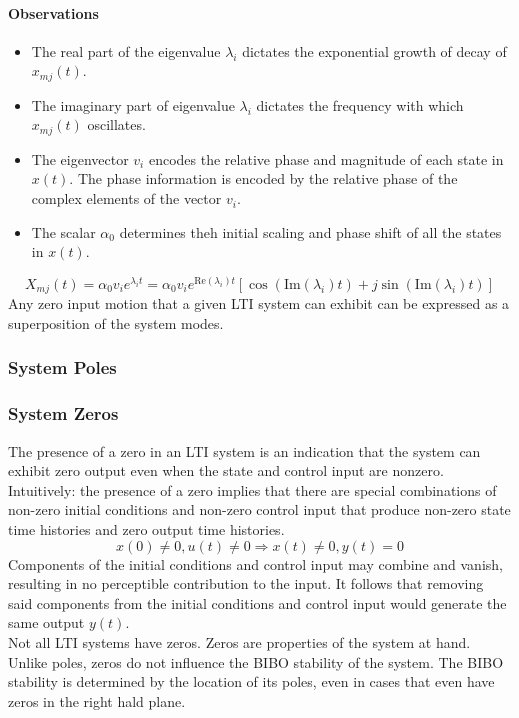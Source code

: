 \documentclass[../notes.tex]{subfiles}
\begin{document}
\paragraph{Observations}
\begin{itemize}
    \item The real part of the eigenvalue $\lambda_i$ dictates the exponential growth of decay of $x_{mj}(t)$.
    \item The imaginary part of eigenvalue $\lambda_i$ dictates the frequency with which $x_{mj}(t)$ oscillates.
    \item The eigenvector $v_i$ encodes the relative phase and magnitude of each state in $x(t)$. The phase information is encoded by the relative phase of the complex elements of the vector $v_i$.
    \item The scalar $\alpha_0$ determines theh initial scaling and phase shift of all the states in $x(t)$.
\end{itemize}
\begin{equation*}
    X_{mj}(t) = \alpha_0 v_i e^{\lambda_i t} = \alpha_0 v_i e^{\text{Re}(\lambda_i)t}[\cos(\text{Im}(\lambda_i)t) + j\sin(\text{Im}(\lambda_i)t)]
\end{equation*}
Any zero input motion that a given LTI system can exhibit can be expressed as a superposition of the system modes.

\subsubsection{System Poles}

\subsubsection{System Zeros}
The presence of a zero in an LTI system is an indication that the system can exhibit zero output even when the state and control input are nonzero. Intuitively: the presence of a zero implies that there are special combinations of non-zero initial conditions and non-zero control input that produce non-zero state time histories and zero output time histories.
\begin{equation*}
    x(0) \neq 0, u(t) \neq 0 \Rightarrow x(t) \neq 0, y(t) = 0
\end{equation*}
Components of the initial conditions and control input may combine and vanish, resulting in no perceptible contribution to the input. It follows that removing said components from the initial conditions and control input would generate the same output $y(t)$. \\
Not all LTI systems have zeros. Zeros are properties of the system at hand. Unlike poles, zeros do not influence the BIBO stability of the system. The BIBO stability is determined by the location of its poles, even in cases that even have zeros in the right hald plane.
\end{document}
